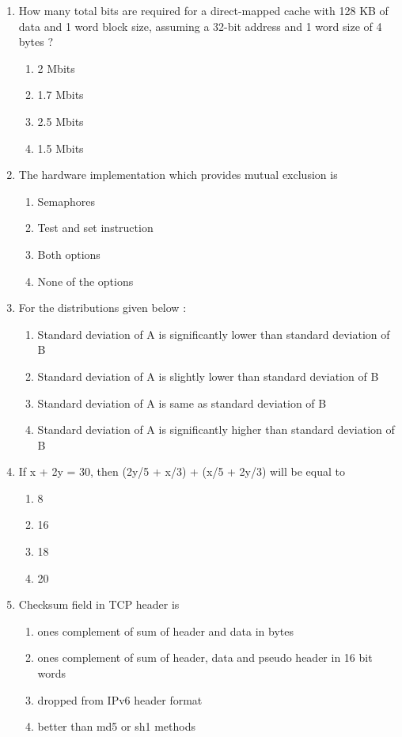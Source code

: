 \documentclass[12pt]{article}
\begin{document}
\begin{enumerate}
\item[61.] How many total bits are required for a direct-mapped cache with 128 KB of data and 1 word block size, assuming a 32-bit address and 1 word size of 4 bytes ?
\begin{enumerate}[label=\Alph*.]
  \item 2 Mbits
  \item 1.7 Mbits
  \item 2.5 Mbits
  \item 1.5 Mbits
\end{enumerate}

\item[62.] The hardware implementation which provides mutual exclusion is
\begin{enumerate}[label=\Alph*.]
  \item Semaphores
  \item Test and set instruction
  \item Both options
  \item None of the options
\end{enumerate}

\item[63.] For the distributions given below :
\begin{enumerate}[label=\Alph*.]
  \item Standard deviation of A is significantly lower than standard deviation of B
  \item Standard deviation of A is slightly lower than standard deviation of B
  \item Standard deviation of A is same as standard deviation of B
  \item Standard deviation of A is significantly higher than standard deviation of B
\end{enumerate}

\item[64.] If x + 2y = 30, then (2y/5 + x/3) + (x/5 + 2y/3) will be equal to
\begin{enumerate}[label=\Alph*.]
  \item 8
  \item 16
  \item 18
  \item 20
\end{enumerate}

\item[65.] Checksum field in TCP header is
\begin{enumerate}[label=\Alph*.]
  \item ones complement of sum of header and data in bytes
  \item ones complement of sum of header, data and pseudo header in 16 bit words
  \item dropped from IPv6 header format
  \item better than md5 or sh1 methods
\end{enumerate}


\end{enumerate}
\end{document}
